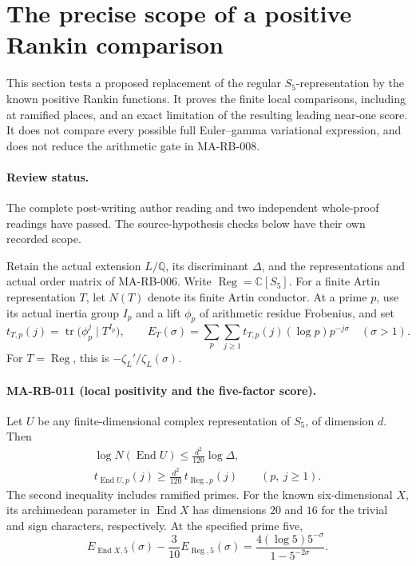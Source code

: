 \section{The precise scope of a positive Rankin comparison}
\label{sec:s5-rankin-scope}

This section tests a proposed replacement of the regular
\(S_5\)-representation by the known positive Rankin functions.
It proves the finite local comparisons, including at ramified
places, and an exact limitation of the resulting leading
near-one score.  It does not compare every possible full
Euler--gamma variational expression, and does not reduce
the arithmetic gate in MA-RB-008.

\paragraph{Review status.}
The complete post-writing author reading and two independent
whole-proof readings have passed.  The source-hypothesis
checks below have their own recorded scope.

Retain the actual extension \(L/\mathbb Q\), its discriminant
\(\Delta\), and the representations and actual order matrix
of MA-RB-006.  Write \(\operatorname{Reg}=\mathbb C[S_5]\).
For a finite Artin representation \(T\), let \(N(T)\)
denote its finite Artin conductor.  At a prime \(p\), use
its actual inertia group \(I_p\) and a lift \(\phi_p\)
of arithmetic residue Frobenius, and set
\[
 t_{T,p}(j)=
       \operatorname{tr}\bigl(\phi_p^j\mid T^{I_p}\bigr),
 \qquad
 E_T(\sigma)=\sum_p\sum_{j\ge1}
             t_{T,p}(j)(\log p)p^{-j\sigma}
              \quad(\sigma>1).
 \tag{MA-RB.150}
\]
For \(T=\operatorname{Reg}\), this is
\(-\zeta_L'/\zeta_L(\sigma)\).

\paragraph{MA-RB-011 (local positivity and the five-factor score).}
Let \(U\) be any finite-dimensional complex representation
of \(S_5\), of dimension \(d\).  Then
\[
 \begin{gathered}
 \log N(\operatorname{End}U)
                       \le \frac{d^2}{120}\log\Delta,\\
 t_{\operatorname{End}U,p}(j)
                  \ge\frac{d^2}{120}\,t_{\operatorname{Reg},p}(j)
                           \qquad(p,\ j\ge1).
 \end{gathered}
 \tag{MA-RB.151}
\]
The second inequality includes ramified primes.
For the known six-dimensional \(X\), its archimedean
parameter in \(\operatorname{End}X\) has dimensions
\(20\) and \(16\) for the trivial and sign characters,
respectively.  At the specified prime five,
\[
 E_{\operatorname{End}X,5}(\sigma)
       -\frac3{10}E_{\operatorname{Reg},5}(\sigma)
       =\frac{4(\log5)5^{-\sigma}}{1-5^{-2\sigma}}.
 \tag{MA-RB.152}
\]

